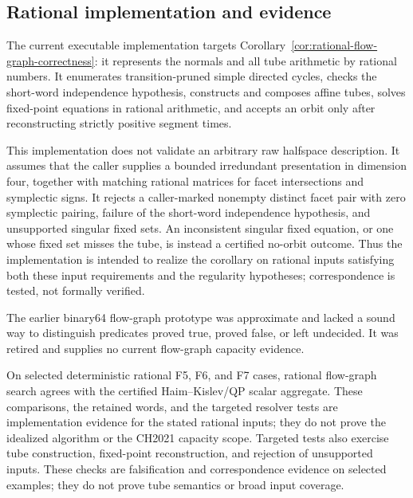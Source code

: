 \subsection{Rational implementation and evidence}
\label{subsec:flow-graph-algorithm-ch2021-implementation}

The current executable implementation targets
Corollary~\ref{cor:rational-flow-graph-correctness}: it represents the normals
and all tube arithmetic by rational numbers.  It enumerates transition-pruned
simple directed cycles,
checks the short-word independence hypothesis, constructs and composes affine
tubes, solves fixed-point equations in rational arithmetic, and accepts an orbit only after
reconstructing strictly positive segment times.

This implementation does not validate an arbitrary raw halfspace description.
It assumes that the caller supplies a bounded irredundant presentation in
dimension four, together with matching rational matrices for facet intersections
and symplectic signs.  It rejects a caller-marked nonempty distinct facet pair
with zero symplectic pairing, failure of the short-word independence
hypothesis, and unsupported singular fixed sets.  An inconsistent singular
fixed equation, or one whose fixed set misses the tube, is instead a certified
no-orbit outcome. Thus the implementation is intended to realize the corollary
on rational inputs satisfying both these input requirements and the regularity
hypotheses; correspondence is tested, not formally verified.

The earlier binary64 flow-graph prototype was approximate and lacked a sound
way to distinguish predicates proved true, proved false, or left undecided.
It was retired and supplies no current flow-graph capacity evidence.

On selected deterministic rational F5, F6, and F7 cases, rational flow-graph
search agrees with the certified Haim--Kislev/QP scalar aggregate. These
comparisons, the retained words, and the targeted resolver tests are
implementation evidence for the stated rational inputs; they do not prove the
idealized algorithm or the CH2021 capacity scope.
Targeted tests also exercise tube construction, fixed-point reconstruction,
and rejection of unsupported inputs. These checks are falsification and correspondence
evidence on selected examples; they do not prove tube semantics or broad input
coverage.
